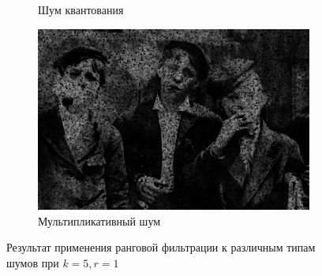\begin{figure}[ht]
\begin{subfigure}[b]{0.5\linewidth}
      \caption{Шум квантования} 
      \label{rang_5_1:e}
    \end{subfigure}%
    \begin{subfigure}[b]{0.5\linewidth}
        \centering
        \includegraphics[width=0.95\linewidth]{../Rang_Filter/Rang_Speckle_noise_(k=5,r=1).jpg} 
        \caption{Мультипликативный шум} 
        \label{rang_5_1:f} 
    \end{subfigure} 
    \caption{Результат применения ранговой фильтрации к различным типам шумов при $k = 5, r = 1$}
    \label{img:rang_5_1} 
\end{figure}

